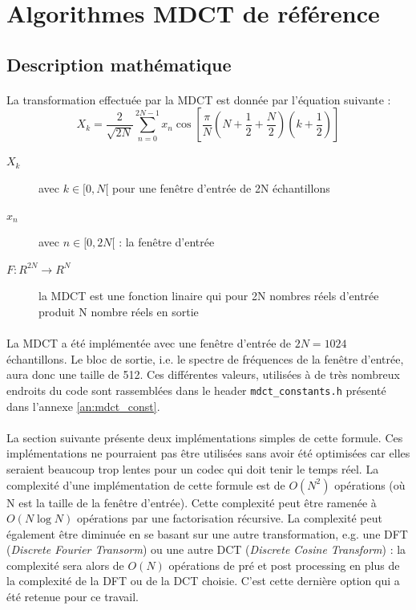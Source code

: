 \documentclass{article}
\begin{document}
    \newpage
    \section{Algorithmes MDCT de référence}
    \subsection{Description mathématique}
    \label{sec:desc-math}
    \paragraph{}
    La transformation effectuée par la MDCT est donnée par l'équation suivante\cite{wiki:MDCT} :
    $$X_k = \frac{2}{\sqrt{2N}} \sum_{n=0}^{2N-1} x_n \cos \left[ \frac{\pi}{N} \left( N + \frac{1}{2} + \frac{N}{2} \right) \left( k + \frac{1}{2} \right) \right]$$
    \begin{description}
        \item[$X_k$] avec $k \in [0, N[$ pour une fenêtre d'entrée de 2N échantillons
        \item[$x_n$] avec $n \in [0, 2N[$ : la fenêtre d'entrée
        \item[$F: R^{2N} \rightarrow R^N$] la MDCT est une fonction linaire qui pour 2N nombres réels d'entrée produit N nombre réels en sortie
    \end{description}

    \paragraph{}
    La MDCT a été implémentée avec une fenêtre d'entrée de $2N = 1024$ échantillons. Le bloc de sortie, i.e. le spectre de fréquences de la fenêtre d'entrée, aura donc une taille de 512. Ces différentes valeurs, utilisées à de très nombreux endroits du code sont rassemblées dans le header \texttt{mdct\_constants.h} présenté dans l'annexe \ref{an:mdct_const}.

    \paragraph{}
    La section suivante présente deux implémentations simples de cette formule. Ces implémentations ne pourraient pas être utilisées sans avoir été optimisées car elles seraient beaucoup trop lentes pour un codec qui doit tenir le temps réel. La complexité d'une implémentation de cette formule est de $O(N^2)$ opérations (où N est la taille de la fenêtre d'entrée). Cette complexité peut être ramenée à $O(N \log N)$ opérations par une factorisation récursive. La complexité peut également être diminuée en se basant sur une autre transformation, e.g. une DFT (\emph{Discrete Fourier Transorm}) ou une autre DCT (\emph{Discrete Cosine Transform}) : la complexité sera alors de $O(N)$ opérations de pré et post processing en plus de la complexité de la DFT ou de la DCT choisie\cite{wiki:MDCT}. C'est cette dernière option qui a été retenue pour ce travail.
\end{document}
